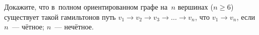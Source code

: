 \begin{problems}
\item
Докажите, что в~полном ориентированном графе на~$n$ вершинах ($n \geq 6$)
существует такой гамильтонов путь $v_1 \to v_2 \to v_3 \to \ldots \to v_{n}$,
что $v_{1} \to v_{n}$, если
\\
\subproblem $n$~--- чётное;
\qquad
\subproblem $n$~--- нечётное.



\end{problems}


